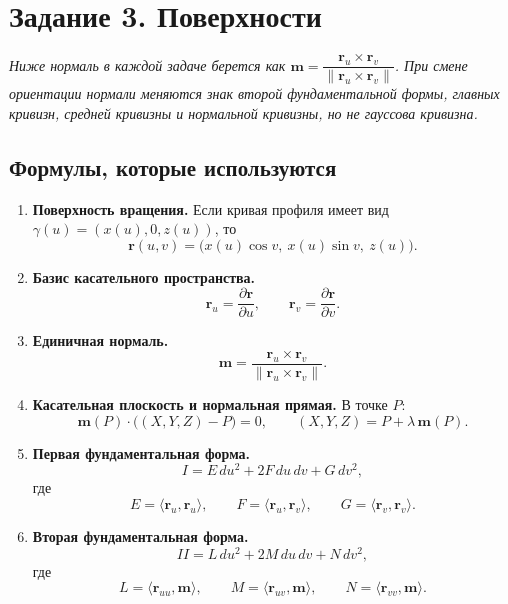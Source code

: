 \documentclass[12pt,a4paper]{article}
\begin{document}
\section*{Задание 3. Поверхности}

\textit{Ниже нормаль в каждой задаче берется как $\mathbf m = \dfrac{\mathbf r_u \times \mathbf r_v}{\|\mathbf r_u \times \mathbf r_v\|}$. При смене ориентации нормали меняются знак второй фундаментальной формы, главных кривизн, средней кривизны и нормальной кривизны, но не гауссова кривизна.}

\subsection*{Формулы, которые используются}

\begin{enumerate}
    \item \textbf{Поверхность вращения.}
    Если кривая профиля имеет вид $\gamma(u) = (x(u),0,z(u))$, то
    \[
    \mathbf r(u,v) = \bigl(x(u)\cos v,\ x(u)\sin v,\ z(u)\bigr).
    \]

    \item \textbf{Базис касательного пространства.}
    \[
    \mathbf r_u = \frac{\partial \mathbf r}{\partial u}, \qquad
    \mathbf r_v = \frac{\partial \mathbf r}{\partial v}.
    \]

    \item \textbf{Единичная нормаль.}
    \[
    \mathbf m = \frac{\mathbf r_u \times \mathbf r_v}{\|\mathbf r_u \times \mathbf r_v\|}.
    \]

    \item \textbf{Касательная плоскость и нормальная прямая.}
    В точке $P$:
    \[
    \mathbf m(P)\cdot\bigl((X,Y,Z)-P\bigr)=0, \qquad (X,Y,Z)=P+\lambda\,\mathbf m(P).
    \]

    \item \textbf{Первая фундаментальная форма.}
    \[
    I = E\,du^2 + 2F\,du\,dv + G\,dv^2,
    \]
    где
    \[
    E=\langle \mathbf r_u,\mathbf r_u\rangle,\qquad
    F=\langle \mathbf r_u,\mathbf r_v\rangle,\qquad
    G=\langle \mathbf r_v,\mathbf r_v\rangle.
    \]

    \item \textbf{Вторая фундаментальная форма.}
    \[
    II = L\,du^2 + 2M\,du\,dv + N\,dv^2,
    \]
    где
    \[
    L=\langle \mathbf r_{uu},\mathbf m\rangle,\qquad
    M=\langle \mathbf r_{uv},\mathbf m\rangle,\qquad
    N=\langle \mathbf r_{vv},\mathbf m\rangle.
    \]


\end{enumerate}
\end{document}
